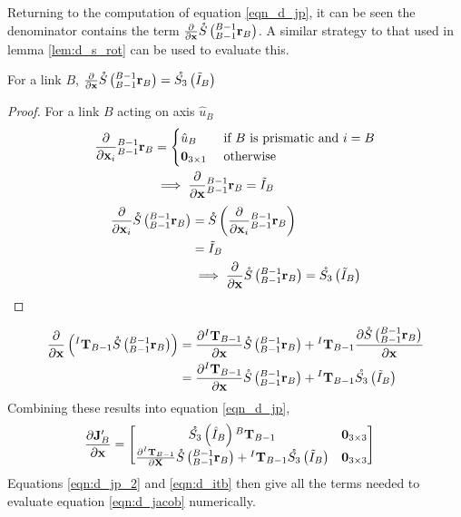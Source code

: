 Returning to the computation of equation \ref{eqn_d_jp}, it can be seen the denominator contains the term $\frac{\partial}{\partial {\mathbf{{x}}}}\mathring{S}\left(^{B-1}_{B-1}\mathbf{r}_{B}\right)$. A similar strategy to that used in lemma \ref{lem:d_s_rot} can be used to evaluate this.
\begin{lemma} \label{lem:d_s_r}
For a link $B$, $\frac{\partial}{\partial {\mathbf{{x}}}}\mathring{S}\left(^{B-1}_{B-1}\mathbf{r}_{B}\right) = \mathring{S_3}\left(\Tilde{I}_B\right)$
\begin{proof}
\noindent For a link $B$ acting on axis $\hat{u}_B$
\begin{align*}
    \frac{\partial}{\partial {\mathbf{{x}}}_i}{^{B-1}_{B-1}\mathbf{r}_{B}} &= \begin{cases}
    \hat{u}_B & \text{ if $B$ is prismatic and  } i = B \\
    {\mathbf{0}}_{3 \times 1} & \text{ otherwise }
    \end{cases} \\ 
    &\implies \frac{\partial}{\partial{\mathbf{{x}}}}{^{B-1}_{B-1}\mathbf{r}_{B}} = \Tilde{I}_B
\end{align*}
\begin{align*}
    \frac{\partial}{\partial {\mathbf{{x}}}_i}\mathring{S}\left(^{B-1}_{B-1}\mathbf{r}_{B}\right) &= \mathring{S}\left(\frac{\partial}{\partial {\mathbf{{x}}}_i}{^{B-1}_{B-1}\mathbf{r}_{B}}\right)\\
    &= \Tilde{I}_B \\
    &\implies \frac{\partial}{\partial{\mathbf{{x}}}}{\mathring{S}\left(^{B-1}_{B-1}\mathbf{r}_{B}\right)} = \mathring{S_3}\left(\Tilde{I}_B\right)
\end{align*}
\end{proof}
\end{lemma}
\begin{align*}
    \frac{\partial}{\partial {\mathbf{{x}}}}\left ( {^I\mathbf{T}_{B-1}}\mathring{S}\left(^{B-1}_{B-1}\mathbf{r}_{B}\right) \right) &= \frac{\partial{^I\mathbf{T}_{B-1}}}{\partial {\mathbf{{x}}}} \mathring{S}\left(^{B-1}_{B-1}\mathbf{r}_{B}\right) +  {^I\mathbf{T}_{B-1}}\frac{\partial{\mathring{S}\left(^{B-1}_{B-1}\mathbf{r}_{B}\right)}}{\partial {\mathbf{{x}}}} \\
    &= \frac{\partial{^I\mathbf{T}_{B-1}}}{\partial {\mathbf{{x}}}} \mathring{S}\left(^{B-1}_{B-1}\mathbf{r}_{B}\right) +  {^I\mathbf{T}_{B-1}}\mathring{S_3}\left(\Tilde{I}_B\right)
\end{align*}
\noindent Combining these results into equation \ref{eqn_d_jp},
\begin{align} \label{eqn:d_jp_2}
    \frac{\partial \mathbf{J}_B'}{\partial {\mathbf{{x}}}} &=
    \begin{bmatrix}
        \mathring{S_3}\left(\hat{I}_B\right){^B}\mathbf{T}_{B-1} & {\mathbf{0}}_{3 \times 3} \\
        \frac{\partial{^I\mathbf{T}_{B-1}}}{\partial \mathbf{X}} \mathring{S}\left(^{B-1}_{B-1}\mathbf{r}_{B}\right) +  {^I\mathbf{T}_{B-1}}\mathring{S_3}\left(\Tilde{I}_B\right) & {\mathbf{0}}_{3 \times 3}
    \end{bmatrix} 
\end{align}
\noindent Equations \ref{eqn:d_jp_2} and \ref{eqn:d_itb} then give all the terms needed to evaluate equation \ref{eqn:d_jacob} numerically.

